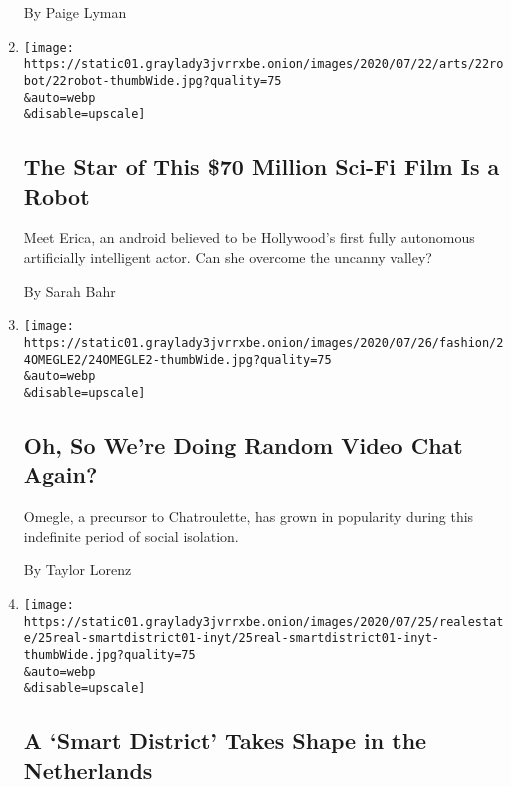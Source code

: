 \begin{enumerate}
  By Paige Lyman
\item
  \href{/2020/07/24/movies/humanoid-robot-actor.html}{}

  \texttt{[image: https://static01.graylady3jvrrxbe.onion/images/2020/07/22/arts/22robot/22robot-thumbWide.jpg?quality=75\\\&auto=webp\\\&disable=upscale]}

  \hypertarget{the-star-of-this-70-million-sci-fi-film-is-a-robot}{%
  \subsection{The Star of This \$70 Million Sci-Fi Film Is a
  Robot}\label{the-star-of-this-70-million-sci-fi-film-is-a-robot}}

  Meet Erica, an android believed to be Hollywood's first fully
  autonomous artificially intelligent actor. Can she overcome the
  uncanny valley?

  By Sarah Bahr
\item
  \href{/2020/07/24/style/omegle-random-video-chat.html}{}

  \texttt{[image: https://static01.graylady3jvrrxbe.onion/images/2020/07/26/fashion/24OMEGLE2/24OMEGLE2-thumbWide.jpg?quality=75\\\&auto=webp\\\&disable=upscale]}

  \hypertarget{oh-so-were-doing-random-video-chat-again}{%
  \subsection{Oh, So We're Doing Random Video Chat
  Again?}\label{oh-so-were-doing-random-video-chat-again}}

  Omegle, a precursor to Chatroulette, has grown in popularity during
  this indefinite period of social isolation.

  By Taylor Lorenz
\item
  \href{/2020/07/24/realestate/brainport-smart-district-takes-shape-in-the-netherlands.html}{}

  \texttt{[image: https://static01.graylady3jvrrxbe.onion/images/2020/07/25/realestate/25real-smartdistrict01-inyt/25real-smartdistrict01-inyt-thumbWide.jpg?quality=75\\\&auto=webp\\\&disable=upscale]}

  \hypertarget{a-smart-district-takes-shape-in-the-netherlands}{%
  \subsection{A `Smart District' Takes Shape in the
  Netherlands}\label{a-smart-district-takes-shape-in-the-netherlands}}


\end{enumerate}
